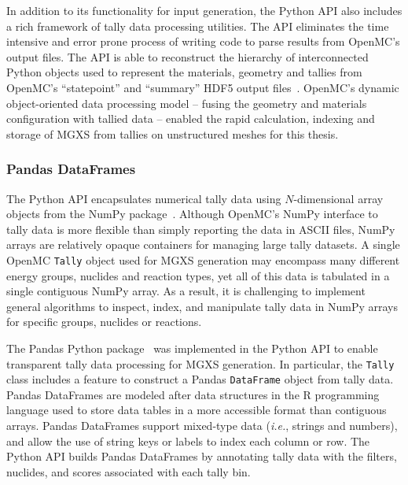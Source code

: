 In addition to its functionality for input generation, the Python \ac{API} also includes a rich framework of tally data processing utilities. The \ac{API} eliminates the time intensive and error prone process of writing code to parse results from OpenMC's output files. The \ac{API} is able to reconstruct the hierarchy of interconnected Python objects used to represent the materials, geometry and tallies from OpenMC's ``statepoint'' and ``summary'' \ac{HDF5} output files~\cite{koranne2011hdf5}. OpenMC's dynamic object-oriented data processing model -- fusing the geometry and materials configuration with tallied data -- enabled the rapid calculation, indexing and storage of \ac{MGXS} from tallies on unstructured meshes for this thesis.
  
\subsubsection{Pandas DataFrames}
\label{subsubsec:chap4-pandas-df}

The Python API encapsulates numerical tally data using $N$-dimensional array objects from the NumPy package~\cite{walt2011numpy}. Although OpenMC's NumPy interface to tally data is more flexible than simply reporting the data in \ac{ASCII} files, NumPy arrays are relatively opaque containers for managing large tally datasets. A single OpenMC \texttt{Tally} object used for \ac{MGXS} generation may encompass many different energy groups, nuclides and reaction types, yet all of this data is tabulated in a single contiguous NumPy array. As a result, it is challenging to implement general algorithms to inspect, index, and manipulate tally data in NumPy arrays for specific groups, nuclides or reactions.

The Pandas Python package~\cite{mckinney2010pandas} was implemented in the Python \ac{API} to enable transparent tally data processing for \ac{MGXS} generation. In particular, the \texttt{Tally} class includes a feature to construct a Pandas 
\texttt{DataFrame} object from tally data. Pandas DataFrames are modeled after data structures in the \textsf{R} programming language used to store data tables in a more accessible format than contiguous arrays. Pandas DataFrames support mixed-type data (\textit{i.e.}, strings and numbers), and allow the use of string keys or labels to index each column or row. The Python \ac{API} builds Pandas DataFrames by annotating tally data with the filters, nuclides, and scores associated with each tally bin. 

